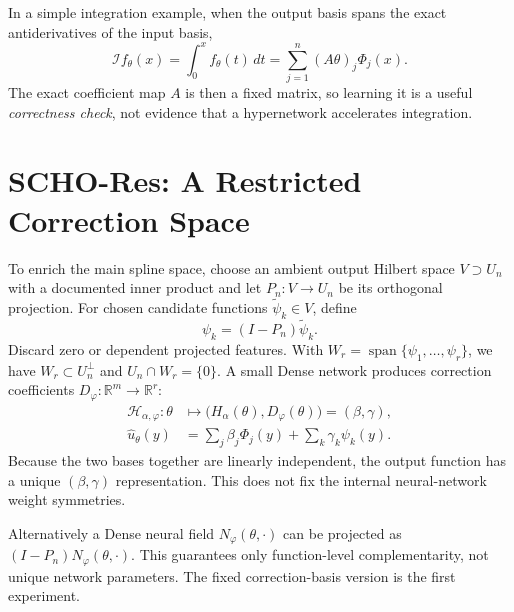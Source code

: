 In a simple integration example, when the output basis spans the exact
antiderivatives of the input basis,
\begin{equation}
  \mathcal I f_\theta(x)=\int_0^x f_\theta(t)\,dt
  =\sum_{j=1}^{n}(A\theta)_j\Phi_j(x).
  \label{eq:scho-integral}
\end{equation}
The exact coefficient map $A$ is then a fixed matrix, so learning it is
a useful \emph{correctness check}, not evidence that a hypernetwork
accelerates integration.




\section{SCHO-Res: A Restricted Correction Space}
\label{sec:scho-res}

To enrich the main spline space, choose an ambient output Hilbert space
$V\supset U_n$ with a documented inner product and let
$P_n:V\to U_n$ be its orthogonal projection. For chosen candidate
functions $\widetilde\psi_k\in V$, define
\begin{equation}
  \psi_k=(I-P_n)\widetilde\psi_k.
  \label{eq:scho-projection}
\end{equation}
Discard zero or dependent projected features. With
$W_r=\operatorname{span}\{\psi_1,\ldots,\psi_r\}$,
we have $W_r\subset U_n^\perp$ and $U_n\cap W_r=\{0\}$.
A small Dense network produces correction coefficients
$D_\varphi:\mathbb R^m\to\mathbb R^r$:
\begin{equation}
  \boxed{
    \begin{aligned}
      \mathcal H_{\alpha,\varphi}:\theta
       & \longmapsto\bigl(H_\alpha(\theta),D_\varphi(\theta)\bigr)
      =(\beta,\gamma),                                             \\
      \widehat u_\theta(y)
       & =\sum_j\beta_j\Phi_j(y)+\sum_k\gamma_k\psi_k(y).
    \end{aligned}}
  \label{eq:scho-res-operator}
\end{equation}
Because the two bases together are linearly independent, the output
function has a unique $(\beta,\gamma)$ representation. This does not
fix the internal neural-network weight symmetries.

Alternatively a Dense neural field $N_\varphi(\theta,\cdot)$ can be
projected as $(I-P_n)N_\varphi(\theta,\cdot)$. This guarantees only
function-level complementarity, not unique network parameters.
The fixed correction-basis version is the first experiment.

